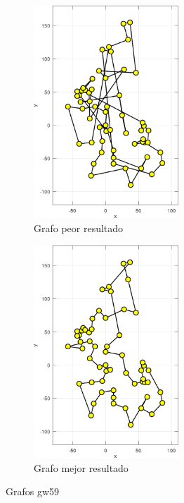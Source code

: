 \documentclass[12pt, a4paper]{article}
\begin{document}
\begin{figure}[H]
    \centering
    \begin{subfigure}[b]{0.45\textwidth}
        \centering
        \includegraphics[width=0.6\textwidth]{img/gw59-worst-graph.png}
        \caption{Grafo peor resultado}
        \label{fig:gw59-worst-graph}
    \end{subfigure}
    \hfill
    \begin{subfigure}[b]{0.45\textwidth}
        \centering
        \includegraphics[width=0.6\textwidth]{img/gw59-best-graph.png}
        \caption{Grafo mejor resultado}
        \label{fig:gw59-best-graph}
    \end{subfigure}
    \caption{Grafos gw59}
    \label{fig:gw59-graphs}
\end{figure}
\end{document}
